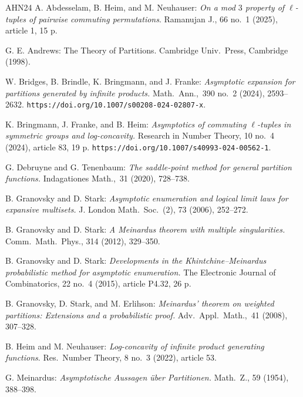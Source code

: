 \documentclass[12pt]{amsart}
\theoremstyle{definition}
\theoremstyle{remark}
\numberwithin{theorem}{section} \numberwithin{equation}{section}
\begin{document}
\begin{thebibliography}{AHN24}
A. Abdesselam, B. Heim, and M. Neuhauser: \emph{On a mod $3$ property of $\ell $-tuples of pairwise commuting permutations\/}.
Ramanujan J., 66 no.\ 1
(2025), article 1, 15 p.

G. E. Andrews: The
Theory of
Partitions. Cambridge Univ.\ Press, Cambridge (1998).

W. Bridges, B. Brindle, K. Bringmann, and J. Franke:
\emph{Asymptotic expansion for partitions generated by infinite products.\/}
Math.\ Ann.,\ 390 no.\ 2
(2024), 2593--2632.
\texttt{https://doi.org/10.1007/s00208-024-02807-x}.

 K. Bringmann, J. Franke, and B. Heim:
\emph{Asymptotics of commuting $\ell$-tuples in
symmetric groups and log-concavity.\/}
Research in Number Theory, 10 no.\ 4 (2024), article 83, 19 p.
\texttt{https://doi.org/10.1007/s40993-024-00562-1}.






 G. Debruyne
and G. Tenenbaum:
\emph{The saddle-point method for general partition functions.\/} Indagationes
Math.,\ 31 (2020), 728--738.






 B. Granovsky and D. Stark: \emph{Asymptotic enumeration and logical limit laws for
expansive multisets.\/} J. London Math.\ Soc.\ (2), 73 (2006), 252--272.

 B. Granovsky and D. Stark: \emph{ 
A Meinardus theorem with multiple singularities.\/} Comm.\
Math.\ Phys., 314 (2012), 329--350.

 B. Granovsky and D. Stark:
\emph{Developments in the Khintchine--Meinardus
probabilistic
method for
asymptotic
enumeration.\/}
The Electronic Journal of Combinatorics,
22 no.\ 4
(2015),
article P4.32, 26 p.

B. Granovsky, D. Stark, and M. Erlihson:
\emph{Meinardus' theorem on weighted partitions:
Extensions and a probabilistic proof.\/}  Adv.\ Appl.\ Math.,\ 41 (2008),
307--328.


 B. Heim and M. Neuhauser:
\emph{Log-concavity of infinite product generating functions\/}. Res.\ Number
Theory, 8 no.\ 3 (2022), article 53.






 G. Meinardus:
\emph{Asymptotische Aussagen über Partitionen.\/}
Math.\ Z., 59 (1954), 388--398.





\end{thebibliography}
\end{document}
